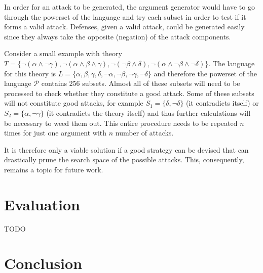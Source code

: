 \documentclass[11pt,twoside,a4paper]{report}
\begin{document}
In order for an attack to be generated, the argument generator would have to go through the powerset of the language and try each subset in order to test if it forms a valid attack. Defenses, given a valid attack, could be generated easily since they always take the opposite (negation) of the attack components.

Consider a small example with theory $T = \{\neg(\alpha\wedge\neg\gamma), \neg(\alpha\wedge\beta\wedge\gamma), \neg(\neg\beta\wedge\delta), \neg(\alpha\wedge\neg\beta\wedge\neg\delta)\}$. The language for this theory is $L = \{\alpha, \beta, \gamma, \delta, \neg\alpha, \neg\beta, \neg\gamma, \neg\delta\}$ and therefore the powerset of the language $\mathcal{P}$ contains 256 subsets. Almost all of these subsets will need to be processed to check whether they constitute a good attack. Some of these subsets will not constitute good attacks, for example $S_1 = \{\delta, \neg\delta\}$ (it contradicts itself) or $S_2 = \{\alpha, \neg\gamma\}$ (it contradicts the theory itself) and thus further calculations will be necessary to weed them out. This entire procedure needs to be repeated $n$ times for just one argument with $n$ number of attacks.

It is therefore only a viable solution if a good strategy can be devised that can drastically prune the search space of the possible attacks. This, consequently, remains a topic for future work.

\chapter{Evaluation}
\label{chap:eval}
TODO

\chapter{Conclusion}
\label{chap:chiliconclusion}

\listoffigures

\lstlistoflistings



\end{document}
